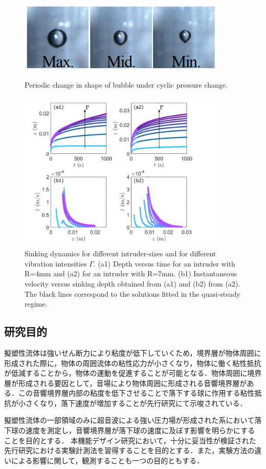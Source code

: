 \begin{center}
    \begin{figure}[h]
        \centering
        \includegraphics[width=10.0cm,clip]{1-Background/3-bubble.png}
        \caption{Periodic change in shape of bubble under cyclic pressure change\cite{ref:5}.}
        \label{fig:3-bubble}
        \centering
        \includegraphics[width=10.0cm,clip]{1-Background/4-sinking.png}
        \caption{Sinking dynamics for different intruder-sizes and for different vibration intensities $\Gamma$. (a1) Depth versus time for an intruder with R=4mm and (a2) for an intruder with R=7mm. (b1) Instantaneous velocity versus sinking depth obtained from (a1) and (b2) from (a2). The black lines correspond to the solutions fitted in the quasi-steady regime\cite{ref:6}.}
        \label{fig:4-sinking}
    \end{figure}
\end{center}

\subsection{研究目的}
擬塑性流体は強いせん断力により粘度が低下していくため，境界層が物体周囲に形成された際に，物体の周囲流体の粘性応力が小さくなり，物体に働く粘性抵抗が低減することから，物体の運動を促進することが可能となる．物体周囲に境界層が形成される要因として，音場により物体周囲に形成される音響境界層がある\cite{ref:7}．この音響境界層内部の粘度を低下させることで落下する球に作用する粘性抵抗が小さくなり，落下速度が増加することが先行研究\cite{ref:8}にて示唆されている．

擬塑性流体の一部領域のみに超音波による強い圧力場が形成された系において落下球の速度を測定し，音響境界層が落下球の速度に及ぼす影響を明らかにすることを目的とする．
本機能デザイン研究において，十分に妥当性が検証された先行研究における実験計測法を習得することを目的とする．また，実験方法の違いによる影響に関して，観測することも一つの目的ともする．
